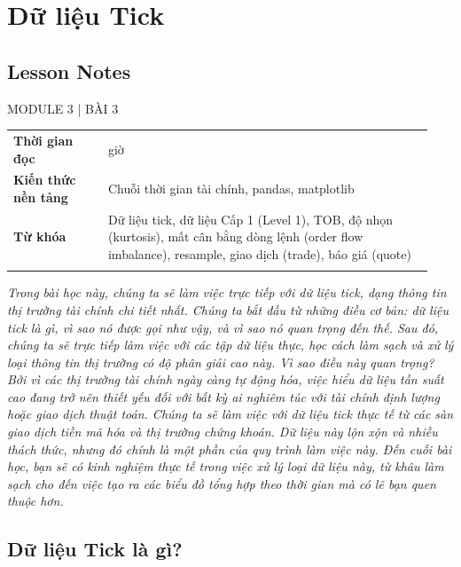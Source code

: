 \chapter{Dữ liệu Tick}
\label{ch:M3L3}


\section*{Lesson Notes}

MODULE 3 | BÀI 3

{\small
\begin{longtable}{>{\raggedright\arraybackslash}p{0.213\linewidth}>{\raggedright\arraybackslash}p{0.727\linewidth}}
\toprule
\textbf{Thời gian đọc} & 6 giờ \\
\addlinespace[2pt]
\textbf{Kiến thức nền tảng} & Chuỗi thời gian tài chính, pandas, matplotlib \\
\addlinespace[2pt]
\textbf{Từ khóa} & Dữ liệu tick, dữ liệu Cấp 1 (Level 1), TOB, độ nhọn (kurtosis), mất cân bằng dòng lệnh (order flow imbalance), resample, giao dịch (trade), báo giá (quote) \\
\addlinespace[2pt]
\bottomrule
\end{longtable}
}

\emph{Trong bài học này, chúng ta sẽ làm việc trực tiếp với dữ liệu tick, dạng thông tin thị trường tài chính chi tiết nhất. Chúng ta bắt đầu từ những điều cơ bản: dữ liệu tick là gì, vì sao nó được gọi như vậy, và vì sao nó quan trọng đến thế. Sau đó, chúng ta sẽ trực tiếp làm việc với các tập dữ liệu thực, học cách làm sạch và xử lý loại thông tin thị trường có độ phân giải cao này.
Vì sao điều này quan trọng? Bởi vì các thị trường tài chính ngày càng tự động hóa, việc hiểu dữ liệu tần suất cao đang trở nên thiết yếu đối với bất kỳ ai nghiêm túc với tài chính định lượng hoặc giao dịch thuật toán. Chúng ta sẽ làm việc với dữ liệu tick thực tế từ các sàn giao dịch tiền mã hóa và thị trường chứng khoán. Dữ liệu này lộn xộn và nhiều thách thức, nhưng đó chính là một phần của quy trình làm việc này. Đến cuối bài học, bạn sẽ có kinh nghiệm thực tế trong việc xử lý loại dữ liệu này, từ khâu làm sạch cho đến việc tạo ra các biểu đồ tổng hợp theo thời gian mà có lẽ bạn quen thuộc hơn.}

\section{Dữ liệu Tick là gì?}

